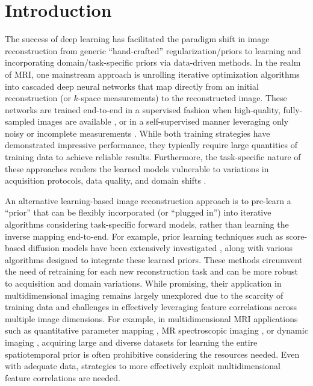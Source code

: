\documentclass[journal,twoside,web]{ieeecolor}
\begin{document}
\section{Introduction}
The success of deep learning has facilitated the paradigm shift in image reconstruction from generic ``hand-crafted'' regularization/priors to learning and incorporating domain/task-specific priors via data-driven methods. In the realm of MRI, one mainstream approach is unrolling iterative optimization algorithms into cascaded deep neural networks that map directly from an initial reconstruction (or $k$-space measurements) to the reconstructed image. These networks are trained end-to-end in a supervised fashion when high-quality, fully-sampled images are available \cite{hammernik2018learning,sun2016deep,MoDL,monga2021algorithm}, or in a self-supervised manner leveraging only noisy or incomplete measurements \cite{yaman2020self,akccakaya2022unsupervised,millard2023theoretical}. While both training strategies have demonstrated impressive performance, they typically require large quantities of training data to achieve reliable results. Furthermore, the task-specific nature of these approaches renders the learned models vulnerable to variations in acquisition protocols, data quality, and domain shifts \cite{darestani2021measuring,heckel2024deep}.

An alternative learning-based image reconstruction approach is to pre-learn a ``prior'' that can be flexibly incorporated (or ``plugged in'') into iterative algorithms considering task-specific forward models, rather than learning the inverse mapping end-to-end. For example, prior learning techniques such as score-based diffusion models have been extensively investigated \cite{vincent2011connection, ho2020denoising, song2019generative}, along with various algorithms designed to integrate these learned priors\cite{gungor2023adaptive,kamilov2023plug,chung2022diffusion,webber2024diffusion}. These methods circumvent the need of retraining for each new reconstruction task and can be more robust to acquisition and domain variations. While promising, their application in multidimensional imaging remains largely unexplored due to the scarcity of training data and challenges in effectively leveraging feature correlations across multiple image dimensions. For example, in multidimensional MRI applications such as quantitative parameter mapping \cite{ma2013magnetic,ma2020three,meng2021accelerating}, MR spectroscopic imaging \cite{posse2013mr,lam2023high_SPM}, or dynamic imaging \cite{oscanoa2023deep,christodoulou2020accelerated}, acquiring large and diverse datasets for learning the entire spatiotemporal prior is often prohibitive considering the resources needed. Even with adequate data, strategies to more effectively exploit multidimensional feature correlations are needed.
\end{document}
